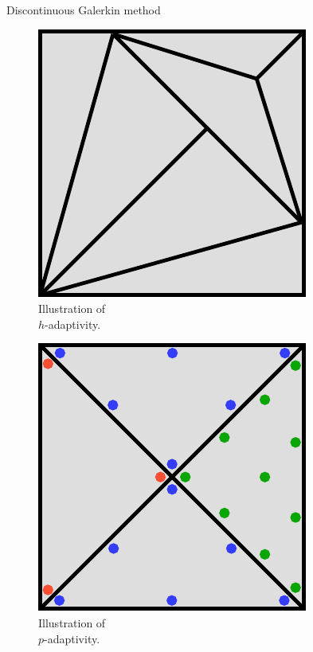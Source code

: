 \begin{frame}{Discontinuous Galerkin method}
\begin{overprint}
 \begin{multicols}{2}
   \begin{figure}[H]
     \centering
     \includegraphics[scale=0.3]{image/h_adaptivity.pdf}
     \caption*{Illustration of \\ $h$-adaptivity.}
     \label{p_adapt_sketch}
   \end{figure}
   \columnbreak
   \begin{figure}[H]
     \centering
     \includegraphics[scale=0.3]{image/p_adaptivity.pdf}
     \caption*{Illustration of \\ $p$-adaptivity.}
     \label{h_adapt_sketch}
   \end{figure}
 \end{multicols}



\end{overprint}
\end{frame}
